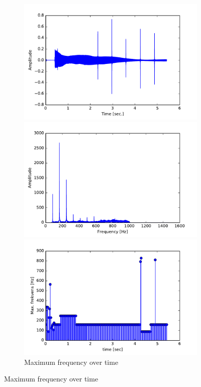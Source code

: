 \begin{figure}[H]
\begin{subfigure}{0.49\textwidth}
\end{subfigure}
\begin{subfigure}{0.49\textwidth}
\centering

\includegraphics[width=\textwidth]{figures/validation/integration/signal_filt.pdf}
\caption{Filtered input signal with noise}
\label{fig:inte_signal_filt}
\includegraphics[width=\textwidth]{figures/validation/integration/f_signal_filt.pdf}
\caption{Frequency spectrum of filtered signal}
\label{fig:inte_SIGNAL_filt}
\includegraphics[width=\textwidth]{figures/validation/integration/peak_dec.pdf}
\caption{Maximum frequency over time}
\label{fig:inte_peak}


\end{subfigure}
\end{figure}
